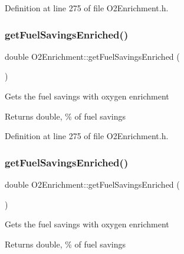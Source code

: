 Definition at line 275 of file O2\+Enrichment.\+h.

\mbox{\label{class_o2_enrichment_a2aa9f8d3a02935931e705f82ae57c72f}} 
\subsubsection{\texorpdfstring{get\+Fuel\+Savings\+Enriched()}{getFuelSavingsEnriched()}\hspace{0.1cm}{\footnotesize\ttfamily [2/3]}}
{\footnotesize\ttfamily double O2\+Enrichment\+::get\+Fuel\+Savings\+Enriched (\begin{DoxyParamCaption}{ }\end{DoxyParamCaption})\hspace{0.3cm}{\ttfamily [inline]}}

Gets the fuel savings with oxygen enrichment \begin{DoxyReturn}{Returns}
double, \% of fuel savings 
\end{DoxyReturn}


Definition at line 275 of file O2\+Enrichment.\+h.

\mbox{\label{class_o2_enrichment_a2aa9f8d3a02935931e705f82ae57c72f}} 
\subsubsection{\texorpdfstring{get\+Fuel\+Savings\+Enriched()}{getFuelSavingsEnriched()}\hspace{0.1cm}{\footnotesize\ttfamily [3/3]}}
{\footnotesize\ttfamily double O2\+Enrichment\+::get\+Fuel\+Savings\+Enriched (\begin{DoxyParamCaption}{ }\end{DoxyParamCaption})\hspace{0.3cm}{\ttfamily [inline]}}

Gets the fuel savings with oxygen enrichment \begin{DoxyReturn}{Returns}
double, \% of fuel savings 
\end{DoxyReturn}



